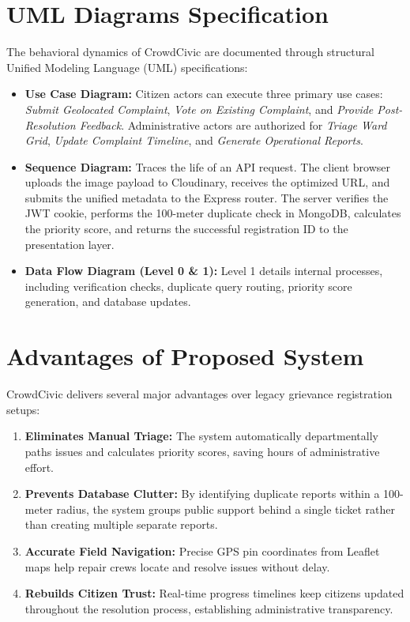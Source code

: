 \documentclass[conference]{IEEEtran}
\begin{document}
\section{UML Diagrams Specification}
The behavioral dynamics of CrowdCivic are documented through structural Unified Modeling Language (UML) specifications:
\begin{itemize}
    \item \textbf{Use Case Diagram:} Citizen actors can execute three primary use cases: \textit{Submit Geolocated Complaint}, \textit{Vote on Existing Complaint}, and \textit{Provide Post-Resolution Feedback}. Administrative actors are authorized for \textit{Triage Ward Grid}, \textit{Update Complaint Timeline}, and \textit{Generate Operational Reports}.
    \item \textbf{Sequence Diagram:} Traces the life of an API request. The client browser uploads the image payload to Cloudinary, receives the optimized URL, and submits the unified metadata to the Express router. The server verifies the JWT cookie, performs the 100-meter duplicate check in MongoDB, calculates the priority score, and returns the successful registration ID to the presentation layer.
    \item \textbf{Data Flow Diagram (Level 0 \& 1):} Level 1 details internal processes, including verification checks, duplicate query routing, priority score generation, and database updates.
\end{itemize}

\section{Advantages of Proposed System}
CrowdCivic delivers several major advantages over legacy grievance registration setups:
\begin{enumerate}
    \item \textbf{Eliminates Manual Triage:} The system automatically departmentally paths issues and calculates priority scores, saving hours of administrative effort.
    \item \textbf{Prevents Database Clutter:} By identifying duplicate reports within a 100-meter radius, the system groups public support behind a single ticket rather than creating multiple separate reports.
    \item \textbf{Accurate Field Navigation:} Precise GPS pin coordinates from Leaflet maps help repair crews locate and resolve issues without delay.
    \item \textbf{Rebuilds Citizen Trust:} Real-time progress timelines keep citizens updated throughout the resolution process, establishing administrative transparency.
\end{enumerate}
\end{document}
